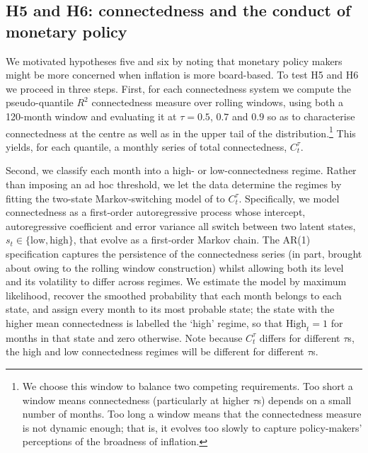 \documentclass{article}
\begin{document}
 

 


\subsection{H5 and H6: connectedness and the conduct of monetary policy}

We motivated hypotheses five and six by noting that monetary policy makers might be more concerned when inflation is more board-based. To test H5 and H6 we proceed in three steps. First, for each connectedness system we
compute the pseudo-quantile $R^2$ connectedness measure over rolling windows, using both
a 120-month window and evaluating it at $\tau=0.5$, $0.7$ and $0.9$ so as to
characterise connectedness at the centre as well as in the upper tail of the distribution.\footnote{We choose this window to balance two competing requirements. Too short a window means connectedness (particularly at higher $\tau$s) depends on a small number of months. Too long a window means that the connectedness measure is not dynamic enough; that is, it evolves too slowly to capture policy-makers' perceptions of the broadness of inflation.} This yields, for each quantile, a monthly series of total connectedness,
$C_t^{\tau}$.

Second, we classify each month into a high- or low-connectedness regime. Rather than
imposing an ad hoc threshold, we let the data determine the regimes by fitting the
two-state Markov-switching model of \citet{hamilton1989new} to $C_t^{\tau}$. Specifically, we
model connectedness as a first-order autoregressive process whose intercept, autoregressive
coefficient and error variance all switch between two latent states,
$s_t\in\{\text{low},\text{high}\}$, that evolve as a first-order Markov chain. The AR(1)
specification captures the persistence of the connectedness series (in part, brought about owing to the rolling window construction) whilst
allowing both its level and its volatility to differ across regimes. We estimate the model
by maximum likelihood, recover the smoothed probability that each month belongs to each
state, and assign every month to its most probable state; the state with the higher mean
connectedness is labelled the `high' regime, so that $\text{High}_t=1$ for months in that
state and zero otherwise.  Note because $C_t^{\tau}$ differs for different ${\tau}$s, the high and low connectedness regimes will be different for different ${\tau}$s.
\end{document}
